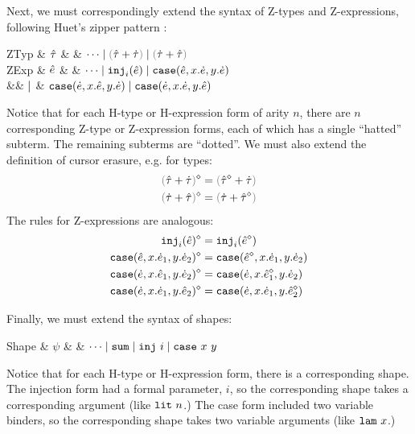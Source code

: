 Next, we must correspondingly extend the syntax of Z-types and
Z-expressions, following Huet's zipper pattern \cite{JFP::Huet1997}:\vspace{-11px}
\begin{grammar}
\textsf{ZTyp} & $\hat{\tau}$ & \bnfas & $\cdots \bnfalt \tsum{\ztau}{\htau} \bnfalt \tsum{\htau}{\ztau}$
\\
\textsf{ZExp} & $\hat{e}$ & \bnfas & $\cdots
\mathrel{\mid} \texttt{inj}_{i}({\hat{e}})
\mathrel{\mid} \texttt{case}({\hat{e}},{x}.{\dot{e}},{y}.{\dot{e}})$
\\
&& $\mathrel{\mid}$ & $\texttt{case}({\dot{e}},{x}.{\hat{e}},{y}.{\dot{e}})
\mathrel{\mid}\texttt{case}({\dot{e}},{x}.{\dot{e}},{y}.{\hat{e}})$
\end{grammar}
Notice that for each H-type or H-expression form of arity $n$, there are
$n$ corresponding Z-type or Z-expression forms, each of which has a single
``hatted'' subterm. The remaining subterms are ``dotted''. We must also
extend the definition of cursor erasure, e.g. for types:
\begin{align*}
\removeSel{\tsum{\ztau}{\htau}} & = \tsum{\removeSel{\ztau}}{\htau}\\
\removeSel{\tsum{\htau}{\ztau}} & = \tsum{\htau}{\removeSel{\ztau}}
\end{align*}
The rules for Z-expressions are analogous:
\begin{align*}
\texttt{inj}_{i}({\hat{e}})^{\diamond} & = \texttt{inj}_{i}({\hat{e}^{\diamond}})\\
\texttt{case}({\hat{e}},{x}.{\dot{e}_1},{y}.{\dot{e}_2})^{\diamond} & = \texttt{case}({\hat{e}^{\diamond}},{x}.{\dot{e}_1},{y}.{\dot{e}_2})\\
\texttt{case}({\dot{e}},{x}.{\hat{e}_1},{y}.{\dot{e}_2})^{\diamond} & = \texttt{case}({\dot{e}},{x}.{\hat{e}_1^{\diamond}},{y}.{\dot{e}_2})\\
\texttt{case}({\dot{e}},{x}.{\dot{e}_1},{y}.{\hat{e}_2})^{\diamond} & = \texttt{case}({\dot{e}},{x}.{\dot{e}_1},{y}.{\hat{e}_2^{\diamond}})
\end{align*}

Finally, we must extend the syntax of shapes:
\begin{grammar}
\textsf{Shape} & $\psi$ & \bnfas & $\cdots \mathrel{\mid} \mathtt{sum} \mathrel{\mid} \mathtt{inj}~i \mathrel{\mid} \mathtt{case}~x~y$
\end{grammar}
Notice that for each H-type or H-expression form, there is a corresponding
shape. The injection form had a formal parameter, $i$, so the corresponding
shape takes a corresponding argument (like $\mathtt{lit}~n$.) The case form
included two variable binders, so the corresponding shape takes two
variable arguments (like $\mathtt{lam}~x$.)




